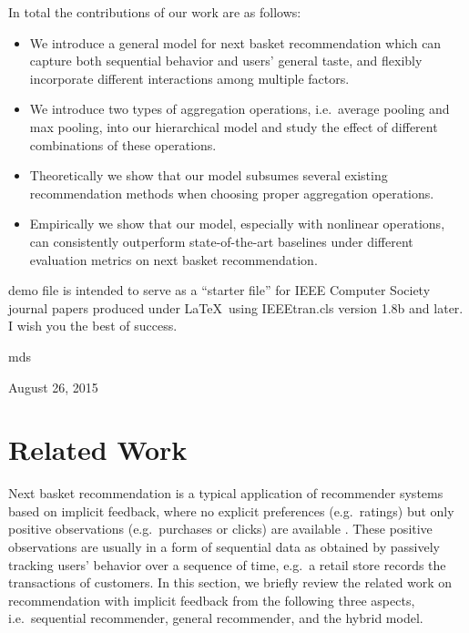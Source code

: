 \documentclass[10pt,journal,compsoc]{IEEEtran}
\begin{document}
In total the contributions of our work are as follows:
 \begin{itemize}
 \item We introduce a general model for next basket recommendation which can capture both sequential behavior and users' general taste, and flexibly incorporate different interactions among multiple factors.
 \item We introduce two types of aggregation operations, i.e.~average pooling and max pooling, into our hierarchical model and study the effect of different combinations of these operations.
 \item Theoretically we show that our model subsumes several existing recommendation methods when choosing proper aggregation operations.
 \item Empirically we show that our model, especially with nonlinear operations, can consistently outperform state-of-the-art baselines under different evaluation metrics on next basket recommendation.
 \end{itemize}



%
%
%
%
 demo file is intended to serve as a ``starter file''
for IEEE Computer Society journal papers produced under \LaTeX\ using
IEEEtran.cls version 1.8b and later.
I wish you the best of success.

\hfill mds

\hfill August 26, 2015

\section{Related Work}
Next basket recommendation is a typical application of recommender systems based on implicit feedback, where no explicit preferences (e.g.~ratings) but only positive observations (e.g.~purchases or clicks) are available \cite{collaborative_improved,workshop_prob_pref}. These positive observations are usually in a form of sequential data as obtained by passively tracking users' behavior over a sequence of time, e.g.~a retail store records the transactions of customers. In this section, we briefly review the related work on recommendation with implicit feedback from the following three aspects, i.e.~sequential recommender, general recommender, and the hybrid model.
\end{document}
